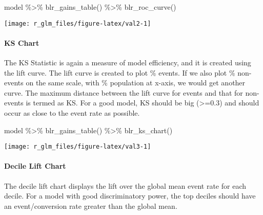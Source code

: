 \documentclass[
]{article}
\newenvironment{Shaded}{\begin{snugshade}}{\end{snugshade}}
\newcommand{\FunctionTok}[1]{\textcolor[rgb]{0.00,0.00,0.00}{#1}}
\newcommand{\NormalTok}[1]{#1}
\newcommand{\SpecialCharTok}[1]{\textcolor[rgb]{0.00,0.00,0.00}{#1}}
\begin{document}
\begin{Shaded}
\begin{Highlighting}[]
\NormalTok{model }\SpecialCharTok{\%\textgreater{}\%}
    \FunctionTok{blr\_gains\_table}\NormalTok{() }\SpecialCharTok{\%\textgreater{}\%}
  \FunctionTok{blr\_roc\_curve}\NormalTok{()}
\end{Highlighting}
\end{Shaded}

\begin{center}\texttt{[image: r\_glm\_files/figure-latex/val2-1]} \end{center}

\hypertarget{ks-chart}{%
\paragraph{KS Chart}\label{ks-chart}}

The KS Statistic is again a measure of model efficiency, and it is
created using the lift curve. The lift curve is created to plot \%
events. If we also plot \% non-events on the same scale, with \%
population at x-axis, we would get another curve. The maximum distance
between the lift curve for events and that for non-events is termed as
KS. For a good model, KS should be big (\textgreater=0.3) and should
occur as close to the event rate as possible.

\begin{Shaded}
\begin{Highlighting}[]
\NormalTok{model }\SpecialCharTok{\%\textgreater{}\%}
    \FunctionTok{blr\_gains\_table}\NormalTok{() }\SpecialCharTok{\%\textgreater{}\%}
  \FunctionTok{blr\_ks\_chart}\NormalTok{()}
\end{Highlighting}
\end{Shaded}

\begin{center}\texttt{[image: r\_glm\_files/figure-latex/val3-1]} \end{center}

\hypertarget{decile-lift-chart}{%
\paragraph{Decile Lift Chart}\label{decile-lift-chart}}

The decile lift chart displays the lift over the global mean event rate
for each decile. For a model with good discriminatory power, the top
deciles should have an event/conversion rate greater than the global
mean.
\end{document}
